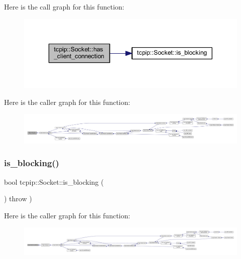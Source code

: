 Here is the call graph for this function\+:\nopagebreak
\begin{figure}[H]
\begin{center}
\leavevmode
\includegraphics[width=343pt]{classtcpip_1_1_socket_a78436cfed4ad686180491c38e88ebfc3_cgraph}
\end{center}
\end{figure}
Here is the caller graph for this function\+:\nopagebreak
\begin{figure}[H]
\begin{center}
\leavevmode
\includegraphics[width=350pt]{classtcpip_1_1_socket_a78436cfed4ad686180491c38e88ebfc3_icgraph}
\end{center}
\end{figure}
\mbox{\label{classtcpip_1_1_socket_a4a599332c62974235bde84f2145066b4}} 
\subsubsection{\texorpdfstring{is\+\_\+blocking()}{is\_blocking()}}
{\footnotesize\ttfamily bool tcpip\+::\+Socket\+::is\+\_\+blocking (\begin{DoxyParamCaption}{ }\end{DoxyParamCaption}) throw  ) }

Here is the caller graph for this function\+:\nopagebreak
\begin{figure}[H]
\begin{center}
\leavevmode
\includegraphics[width=350pt]{classtcpip_1_1_socket_a4a599332c62974235bde84f2145066b4_icgraph}
\end{center}
\end{figure}
\mbox{\label{classtcpip_1_1_socket_ab7e67c84c32557ffb98d940081497d67}} 
